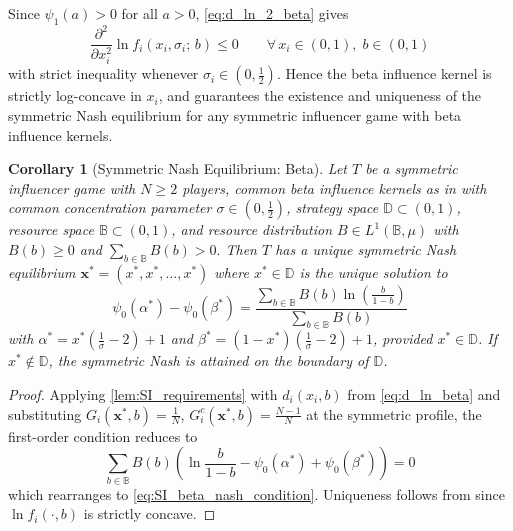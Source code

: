 \documentclass{article}
\newtheorem{corollary}{Corollary}[theorem]
\begin{document}
                Since $\psi_1(a) > 0$ for all $a > 0$, \cref{eq:d_ln_2_beta} gives
                \begin{equation}
                    \frac{\partial^2}{\partial x_i^2}\ln f_i(x_i,\sigma_i;\,b) \leq 0 \qquad \forall\, x_i \in (0,1),\; b \in (0,1)
                \end{equation}
                with strict inequality whenever $\sigma_i \in (0,\frac{1}{2})$. Hence the beta influence kernel is strictly log-concave in $x_i$, and  guarantees the existence and uniqueness of the symmetric Nash equilibrium for any symmetric influencer game with beta influence kernels.

            \begin{corollary}[Symmetric Nash Equilibrium: Beta]\label{cor:nash_beta}
                Let $T$ be a symmetric influencer game with $N \geq 2$ players, common beta influence kernels as in  with common concentration parameter $\sigma \in (0,\frac{1}{2})$, strategy space $\mathbb{D} \subset (0,1)$, resource space $\mathbb{B} \subset (0,1)$, and resource distribution $B \in L^1(\mathbb{B},\mu)$ with $B(b) \geq 0$ and $\sum_{b \in \mathbb{B}} B(b) > 0.$ Then $T$ has a unique symmetric Nash equilibrium $\mathbf{x}^* = (x^*,x^*,\ldots,x^*)$ where $x^* \in \mathbb{D}$ is the unique solution to
                \begin{equation}\label{eq:SI_beta_nash_condition}
                    \psi_0(\alpha^*) - \psi_0(\beta^*) = \frac{\sum_{b\in\mathbb{B}} B(b)\ln\!\left(\frac{b}{1-b}\right)}{\sum_{b\in\mathbb{B}} B(b)}
                \end{equation}
                with $\alpha^* = x^*\!\left(\frac{1}{\sigma}-2\right)+1$ and $\beta^* = (1-x^*)\!\left(\frac{1}{\sigma}-2\right)+1$, provided $x^* \in \mathbb{D}$. If $x^* \notin \mathbb{D}$, the symmetric Nash is attained on the boundary of $\mathbb{D}$.
            \end{corollary}
            \begin{proof}
                Applying \cref{lem:SI_requirements} with $d_i(x_i,b)$ from \cref{eq:d_ln_beta} and substituting $G_i(\mathbf{x}^*,b) = \frac{1}{N}$, $G_i^c(\mathbf{x}^*,b) = \frac{N-1}{N}$ at the symmetric profile, the first-order condition reduces to
                \begin{equation}
                    \sum_{b\in\mathbb{B}} B(b)\left(\ln\frac{b}{1-b} - \psi_0(\alpha^*) + \psi_0(\beta^*)\right) = 0
                \end{equation}
                which rearranges to \cref{eq:SI_beta_nash_condition}. Uniqueness follows from  since $\ln f_i(\cdot,b)$ is strictly concave.
            \end{proof}
\end{document}
